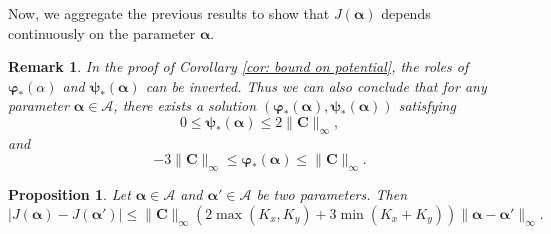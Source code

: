 \documentclass{article}
\def\cA{\mathcal{A}}
\def\aalpha{\boldsymbol{\alpha}}
\def\pphi{\boldsymbol{\varphi}}
\def\ppsi{\boldsymbol{\psi}}
\def\CC{\mathbf{C}}
\newtheorem{prop}[thm]{Proposition}
\newtheorem{rmk}[thm]{Remark}
\begin{document}
%
Now, we aggregate the previous results to show that $J(\aalpha)$ depends continuously on the parameter $\aalpha$.
%

\begin{rmk}\label{rmk: bound on potential}
    In the proof of Corollary \ref{cor: bound on potential}, the roles of $\pphi_*(\alpha)$ and $\ppsi_*(\aalpha)$ can be inverted. Thus we can also conclude that for any parameter $\aalpha \in \cA$, there exists a solution $(\pphi_*(\aalpha), \ppsi_*(\aalpha))$ satisfying 
    \begin{equation}
        0\leq \ppsi_*(\aalpha) \leq 2 \| \CC\|_\infty, 
    \end{equation}
    and
    \begin{equation}
        - 3\| \CC \|_\infty \leq \pphi_*(\aalpha) \leq  \| \CC \|_\infty.
    \end{equation}
    
\end{rmk}
%
\begin{prop} \label{prop: contiuity with respect to alpha}
    Let $\aalpha \in \cA$ and $\aalpha' \in \cA$ be two parameters. Then 
    \begin{equation*}
        |J(\aalpha) - J(\aalpha')| \leq \|\CC\|_\infty \left( 2 \max(K_x, K_y)+ 3 \min(K_x + K_y) \right) \|\aalpha  - \aalpha '\|_\infty .
    \end{equation*}
\end{prop}
%
\end{document}
